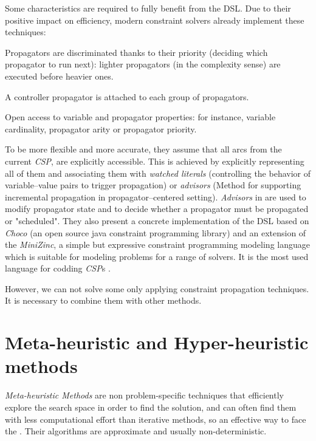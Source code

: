 Some characteristics are required to fully benefit from the DSL. Due to their positive impact on efficiency, modern constraint solvers already implement these techniques:
\begin{inparaenum}[i)] %
	\item Propagators are discriminated thanks to their priority (deciding which propagator to run next): lighter propagators (in the complexity sense) are executed before heavier ones.
	\item A controller propagator is attached to each group of propagators.
	\item Open access to variable and propagator properties: for instance, variable cardinality, propagator arity or propagator priority.
\end{inparaenum}%

To be more flexible and more accurate, they assume that all arcs from the current \textit{CSP}, are explicitly accessible. This is achieved by explicitly representing all of them and associating them with {\it watched literals} \cite{Gent2006} (controlling the behavior of variable--value pairs to trigger propagation) or {\it advisors} \cite{Lagerkvist2007} (Method for supporting incremental propagation in propagator--centered setting). {\it Advisors} in \cite{Lagerkvist2007} are used to modify propagator state and to decide whether a propagator must be propagated or "scheduled". They also present a concrete implementation of the DSL based on {\it Choco} \cite{Jussien2008} (an open source java constraint programming library) and an extension of the \textit{MiniZinc}, a simple but expressive constraint programming modeling language which is suitable for modeling problems for a range of solvers. It is the most used language for codding \textit{CSP}s \cite{Nethercote}.

However, we can not solve some \csps{} only applying constraint propagation techniques. It is necessary to combine them with other methods. 

\section{Meta-heuristic and Hyper-heuristic methods}
\label{sec:meta}

{\it Meta-heuristic Methods} are non problem-specific techniques that efficiently explore the search space in order to find the solution, and can often find them with less computational effort than iterative methods, so an effective way to face the \csps. Their algorithms are approximate and usually non-deterministic.

